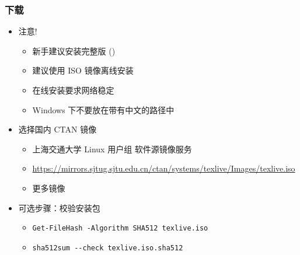 \begin{frame}[fragile]
  \frametitle{下载}
  \begin{itemize}
    \item 注意!
          \begin{itemize}
            \item 新手建议安装完整版 \TL{} (\MacTeX)
            \item 建议使用 ISO 镜像离线安装
            \item 在线安装要求网络稳定
            \item Windows 下不要放在带有中文的路径中
          \end{itemize}
    \item 选择国内 CTAN 镜像
          \begin{itemize}
            \item 上海交通大学 Linux 用户组 软件源镜像服务
            \item {\footnotesize
                    \url{https://mirrors.sjtug.sjtu.edu.cn/ctan/systems/texlive/Images/texlive.iso}
                  }
            \item 更多镜像 
          \end{itemize}
    \item 可选步骤：校验安装包
          \begin{itemize}
            \item \verb|Get-FileHash -Algorithm SHA512 texlive.iso|
            \item \verb|sha512sum --check texlive.iso.sha512|
          \end{itemize}
  \end{itemize}
\end{frame}

